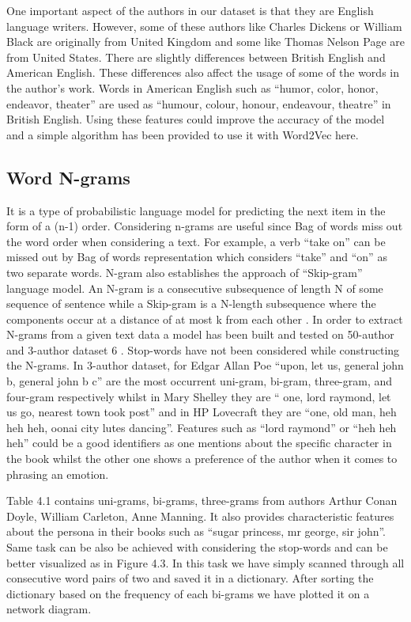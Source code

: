 One important aspect of the authors in our dataset is that they are English language writers. However, some of these authors like Charles Dickens or William Black are originally from United Kingdom and some like Thomas Nelson Page are from United States. There are slightly differences between British English and American
English. These differences also affect the usage of some of the words in the author’s work. Words in American English such as “humor, color, honor, endeavor, theater” are used as “humour, colour, honour, endeavour, theatre” in British English. Using these features could improve the accuracy of the model and a simple algorithm has been provided to use it with Word2Vec here.

\subsection{Word N-grams}
It is a type of probabilistic language model for predicting the next item in the form of a (n-1) order. Considering n-grams are useful since Bag of words miss out the word order when considering a text. For example, a verb “take on” can be missed out by Bag of words representation which considers “take” and “on” as two separate words. N-gram also establishes the approach of “Skip-gram” language model. An N-gram is a consecutive subsequence of length N of some sequence of sentence while a Skip-gram is a N-length subsequence where the components occur at a distance of at most k from each other \cite{mikolov2013efficient}.
In order to extract N-grams from a given text data a model has been built and tested on 50-author and 3-author dataset 6 . Stop-words have not been considered while constructing the N-grams. In 3-author dataset, for Edgar Allan Poe “upon, let us, general john b, general john b c” are the most occurrent uni-gram, bi-gram,
three-gram, and four-gram respectively whilst in Mary Shelley they are “ one, lord raymond, let us go, nearest town took post” and in HP Lovecraft they are “one, old man, heh heh heh, oonai city lutes dancing”. Features such as “lord raymond” or “heh heh heh” could be a good identifiers as one mentions about the specific character in the book whilst the other one shows a preference of the author when it comes to
phrasing an emotion.

Table 4.1 contains uni-grams, bi-grams, three-grams from authors Arthur Conan Doyle, William Carleton, Anne Manning. It also provides characteristic features about the persona in their books such as “sugar princess, mr george, sir john”. Same task can be also be achieved with considering the stop-words and can be better visualized as in Figure 4.3. In this task we have simply scanned through all consecutive word pairs of two and saved it in a dictionary. After sorting the dictionary based on the frequency of each bi-grams we have plotted it on a network diagram.

